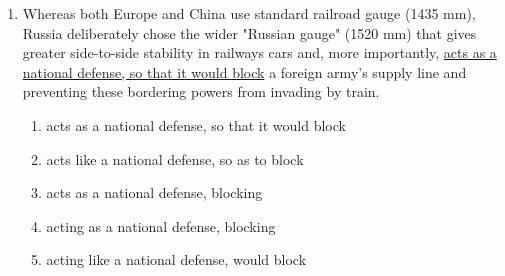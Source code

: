 \documentclass[12pt]{article}
\begin{document}
\begin{enumerate}[label=\textbf{\arabic*.}]
\begin{enumerate}[label=(\Alph*),itemsep=8pt]

\item Walter Mondale had a long difficult struggle leading up to the 1984 Democratic Presidential Primary, though he consolidated his lead for the nomination, but he won only

\item Having had a long difficult struggle leading up to the 1984 Democratic Presidential Primary, Walter Mondale still consolidated the nomination lead, only winning

\item After a long difficult struggle leading up to the 1984 Democratic Presidential Primary, Walter Mondale consolidated his lead for the nomination, but he won only

\item A long difficult struggle leading up to the 1984 Democratic Presidential Primary, Walter Mondale, consolidating his lead for the nomination, but he won only

\item Walter Mondale had a long difficult struggle leading up to the 1984 Democratic Presidential Primary, consolidated his lead for the nomination, and only won

\end{enumerate}

\item Whereas both Europe and China use standard railroad gauge (1435 mm), Russia deliberately chose the wider "Russian gauge" (1520 mm) that gives greater side-to-side stability in railways cars and, more importantly, \underline{acts as a national defense, so that it would block} a foreign army's supply line and preventing these bordering powers from invading by train.

\begin{enumerate}[label=(\Alph*),itemsep=8pt]

\item acts as a national defense, so that it would block

\item acts like a national defense, so as to block

\item acts as a national defense, blocking

\item acting as a national defense, blocking

\item acting like a national defense, would block


\end{enumerate}
\end{enumerate}
\end{document}
